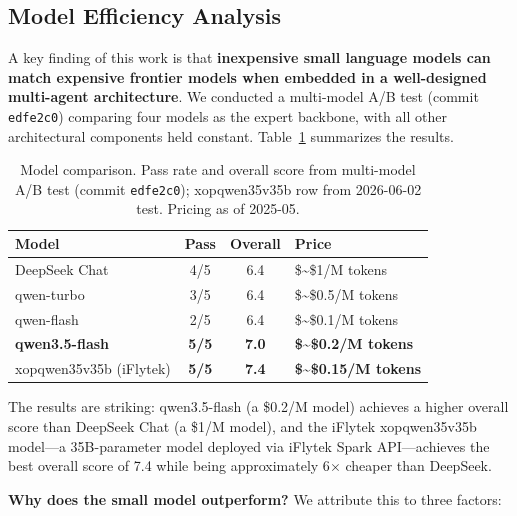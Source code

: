 \subsection{Model Efficiency Analysis}

A key finding of this work is that \textbf{inexpensive small language models can match expensive frontier models when embedded in a well-designed multi-agent architecture}. We conducted a multi-model A/B test (commit \texttt{edfe2c0}) comparing four models as the expert backbone, with all other architectural components held constant. Table~\ref{tab:model_compare} summarizes the results.

\begin{table}[H]
\centering
\caption{Model comparison. Pass rate and overall score from multi-model A/B test (commit \texttt{edfe2c0}); xopqwen35v35b row from 2026-06-02 test. Pricing as of 2025-05.}
\label{tab:model_compare}
\begin{tabular}{@{}lccp{2.5cm}@{}}
\toprule
\textbf{Model} & \textbf{Pass} & \textbf{Overall} & \textbf{Price} \\
\midrule
DeepSeek Chat & 4/5 & 6.4 & \$\textasciitilde\$1/M tokens \\
qwen-turbo & 3/5 & 6.4 & \$\textasciitilde\$0.5/M tokens \\
qwen-flash & 2/5 & 6.4 & \$\textasciitilde\$0.1/M tokens \\
\textbf{qwen3.5-flash} & \textbf{5/5} & \textbf{7.0} & \textbf{\$\textasciitilde\$0.2/M tokens} \\
\midrule
xopqwen35v35b (iFlytek) & \textbf{5/5} & \textbf{7.4} & \textbf{\$\textasciitilde\$0.15/M tokens} \\
\bottomrule
\end{tabular}
\end{table}

The results are striking: qwen3.5-flash (a \$0.2/M model) achieves a higher overall score than DeepSeek Chat (a \$1/M model), and the iFlytek xopqwen35v35b model---a 35B-parameter model deployed via iFlytek Spark API---achieves the best overall score of 7.4 while being approximately 6$\times$ cheaper than DeepSeek.

\textbf{Why does the small model outperform?} We attribute this to three factors:

